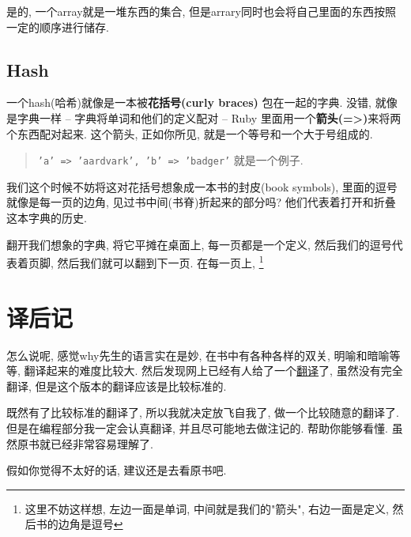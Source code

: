 是的, 一个array就是一堆东西的集合, 
但是arrary同时也会将自己里面的东西按照一定的顺序进行储存. 

\subsection*{Hash}
一个hash(哈希)就像是一本被\textbf{花括号(curly braces)}
包在一起的字典. 没错, 就像是字典一样 -- 字典将单词和他们的定义配对 --
Ruby 里面用一个\textbf{箭头(=>)}来将两个东西配对起来. 这个箭头, 
正如你所见, 就是一个等号和一个大于号组成的. 

\begin{quotation}
  \texttt{{'a' => 'aardvark', 'b' => 'badger'}} 就是一个例子. 
\end{quotation}

我们这个时候不妨将这对花括号想象成一本书的封皮(book symbols), 
里面的逗号就像是每一页的边角, 见过书中间(书脊)折起来的部分吗? 
他们代表着打开和折叠这本字典的历史. 

翻开我们想象的字典, 将它平摊在桌面上, 每一页都是一个定义, 
然后我们的逗号代表着页脚, 然后我们就可以翻到下一页. 在每一页上, 
\footnote{这里不妨这样想, 左边一面是单词, 中间就是我们的"箭头", 右边一面是定义, 然后书的边角是逗号}

\section*{译后记}
怎么说呢, 感觉why先生的语言实在是妙, 在书中有各种各样的双关, 
明喻和暗喻等等, 翻译起来的难度比较大. 
然后发现网上已经有人给了一个\href{http://codecly259.github.io/poignant-guide-cn/book/chapter-3.html}{翻译}了, 
虽然没有完全翻译, 但是这个版本的翻译应该是比较标准的. 

既然有了比较标准的翻译了, 所以我就决定放飞自我了, 
做一个比较随意的翻译了. 但是在编程部分我一定会认真翻译, 
并且尽可能地去做注记的. 帮助你能够看懂. 虽然原书就已经非常容易理解了.

假如你觉得不太好的话, 建议还是去看原书吧. 